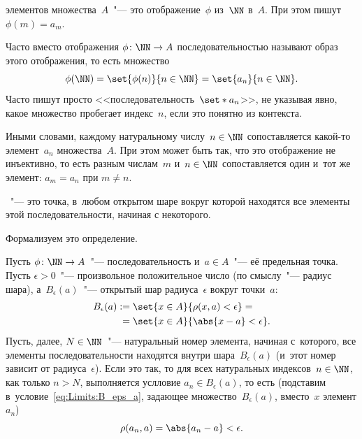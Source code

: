 \begin{definition}
	 элементов множества~$A$~"--- это отображение~$\phi$
	из~$\NN$ в~$A$. При этом пишут $\phi(m) = a_m$.

	Часто вместо отображения $\phi \colon \NN \to A$ последовательностью называют
	образ этого отображения, то есть множество
	\[
		\phi(\NN) = \set{\phi(n)}{n \in \NN} = \set{a_n}{n \in \NN}
		.
	\]
	Часто пишут просто <<последовательность~$\set*{a_n}$>>, не указывая явно,
	какое множество пробегает индекс~$n$, если это понятно из контекста.
\end{definition}
Иными словами, каждому натуральному числу~$n \in \NN$ сопоставляется какой-то
элемент~$a_n$ множества~$A$. При этом может быть так, что это отображение не
инъективно, то есть разным числам~$m$ и~$n \in \NN$ сопоставляется один и~тот
же элемент: $a_m = a_n$ при $m \neq n$.


\begin{definition}
	~"--- это точка, в~любом открытом
	шаре вокруг которой находятся все элементы этой последовательности, начиная с
	некоторого.
\end{definition}

Формализуем это определение.

Пусть $\phi\colon \NN \to A$~"--- последовательность и~$a \in A$~"--- её предельная точка. Пусть $\epsilon > 0$~"--- произвольное положительное число (по смыслу~"--- радиус шара), а~$B_\epsilon(a)$~"--- открытый шар радиуса~$\epsilon$ вокруг точки~$a$:
\begin{align}
	B_\epsilon(a) :=
	{} &
	\set{x \in A}{\rho(x, a) < \epsilon}
	\label{eq:Limits:B_eps_a}
	= {} \\ {} = {} &
	\set{x \in A}{\abs{x - a} < \epsilon}
	.
	\notag
\end{align}
Пусть, далее, $N \in \NN$~"--- натуральный номер элемента, начиная с~которого, все элементы последовательности находятся внутри шара~$B_\epsilon(a)$ (и~этот номер зависит от радиуса~$\epsilon$). Если это так, то для всех натуральных индексов~$n \in \NN$, как только $n > N$, выполняется услловие $a_n \in B_\epsilon(a)$, то есть (подставим в~условие~\eqref{eq:Limits:B_eps_a}, задающее множество~$B_\epsilon(a)$, вместо~$x$ элемент $a_n$)
\[
	\rho(a_n, a) = \abs{a_n - a} < \epsilon.
\]

